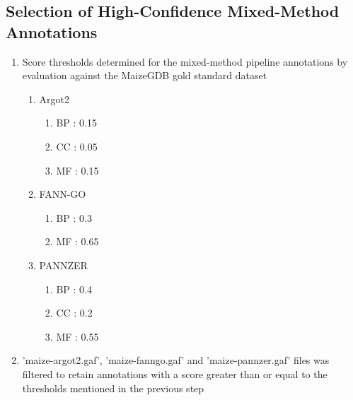 \documentclass[11pt,letterpaper]{article}
\begin{document}
    \subsection{Selection of High-Confidence Mixed-Method Annotations}
      \begin{enumerate}
        \item Score thresholds determined for the mixed-method pipeline annotations by evaluation against the MaizeGDB gold standard dataset
        \begin{enumerate}
          \item Argot2
          \begin{enumerate}
            \item BP : 0.15
            \item CC : 0.05
            \item MF : 0.15
          \end{enumerate}
          \item FANN-GO
          \begin{enumerate}
            \item BP : 0.3
            \item MF : 0.65
          \end{enumerate}
          \item PANNZER
          \begin{enumerate}
            \item BP : 0.4
            \item CC : 0.2
            \item MF : 0.55
          \end{enumerate}
        \end{enumerate}
        \item 'maize-argot2.gaf', 'maize-fanngo.gaf' and 'maize-pannzer.gaf' files was filtered to retain annotations with a score greater than or equal to the thresholds mentioned in the previous step
      \end{enumerate}
\end{document}
